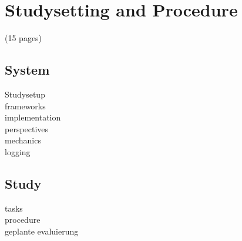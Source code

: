 \chapter{Studysetting and Procedure}
(15 pages)
\section{System}
Studysetup\\
frameworks\\
implementation\\
perspectives\\
mechanics\\
logging\\
\section{Study}
tasks\\
procedure\\
geplante evaluierung\\